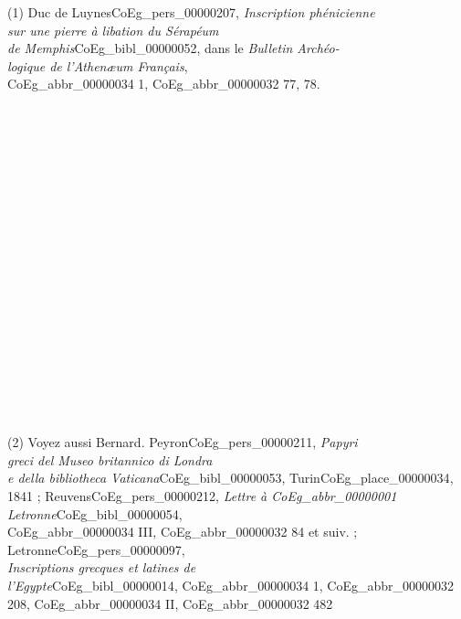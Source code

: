 \documentclass{book}
\begin{document}
{\begin{paracol}{2}
\noindent \\
\\
\\
\\
\\
\\
\\
\\
\\
\\
(1) Duc de Luynes\gls{CoEg_pers_00000207}, \textit{Inscription phénicienne\\
sur une pierre à libation du Sérapéum\\
de Memphis}\gls{CoEg_bibl_00000052}, dans le \textit{Bulletin Archéo-\\
logique de l’Athenæum Français},\\
\gls{CoEg_abbr_00000034} 1, \gls{CoEg_abbr_00000032} 77, 78.\\
\\
\\
\\
\\
\\
\\
\\
\\
\\
\\
\\
\\
\\
\\
\\
\\
\\
\\
\\
(2) Voyez aussi Bernard. Peyron\gls{CoEg_pers_00000211}, \textit{Papyri\\
greci del Museo britannico di Londra\\
e della bibliotheca Vaticana}\gls{CoEg_bibl_00000053}, Turin\gls{CoEg_place_00000034},\\
1841 ; Reuvens\gls{CoEg_pers_00000212}, \textit{Lettre à \gls{CoEg_abbr_00000001} Letronne}\gls{CoEg_bibl_00000054},\\
\gls{CoEg_abbr_00000034} III, \gls{CoEg_abbr_00000032} 84 et suiv. ; Letronne\gls{CoEg_pers_00000097},\\
\textit{Inscriptions grecques et latines de\\
l’Egypte}\gls{CoEg_bibl_00000014}, \gls{CoEg_abbr_00000034} 1, \gls{CoEg_abbr_00000032} 208, \gls{CoEg_abbr_00000034} II, \gls{CoEg_abbr_00000032} 482\\

\end{paracol}}
\end{document}
